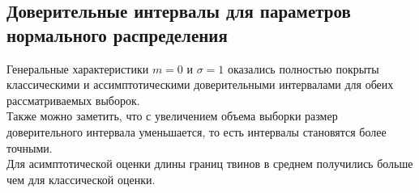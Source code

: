 \subsection{Доверительные интервалы для параметров нормального распределения}

Генеральные характеристики $m = 0$ и $\sigma = 1$ оказались полностью покрыты классическими и ассимптотическими доверительными интервалами для обеих рассматриваемых выборок. \\
Также можно заметить, что с увеличением объема выборки размер доверительного интервала уменьшается, то есть интервалы становятся более точными.\\
Для асимптотической оценки длины границ твинов в среднем получились больше чем для классической оценки. \\
  

